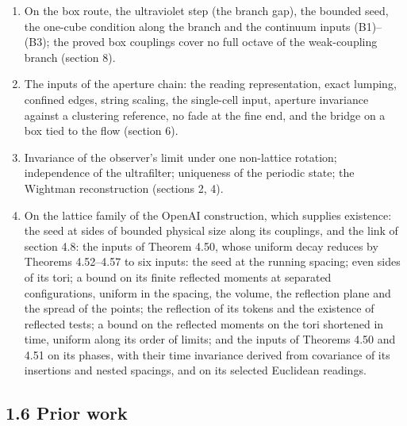 \documentclass[10pt,letterpaper,twocolumn]{article}
\begin{document}
\begin{enumerate}
\item
  On the box route, the ultraviolet step (the branch gap), the bounded seed, the one-cube condition along the branch and the continuum inputs (B1)--(B3); the proved box couplings cover no full octave of the weak-coupling branch (section 8).
\item
  The inputs of the aperture chain: the reading representation, exact lumping, confined edges, string scaling, the single-cell input, aperture invariance against a clustering reference, no fade at the fine end, and the bridge on a box tied to the flow (section 6).
\item
  Invariance of the observer's limit under one non-lattice rotation; independence of the ultrafilter; uniqueness of the periodic state; the Wightman reconstruction (sections 2, 4).
\item
  On the lattice family of the OpenAI construction, which supplies existence: the seed at sides of bounded physical size along its couplings, and the link of section 4.8: the inputs of Theorem 4.50, whose uniform decay reduces by Theorems 4.52--4.57 to six inputs: the seed at the running spacing; even sides of its tori; a bound on its finite reflected moments at separated configurations, uniform in the spacing, the volume, the reflection plane and the spread of the points; the reflection of its tokens and the existence of reflected tests; a bound on the reflected moments on the tori shortened in time, uniform along its order of limits; and the inputs of Theorems 4.50 and 4.51 on its phases, with their time invariance derived from covariance of its insertions and nested spacings, and on its selected Euclidean readings.
\end{enumerate}

\subsection{1.6 Prior work}\label{16-prior-work}
\end{document}
